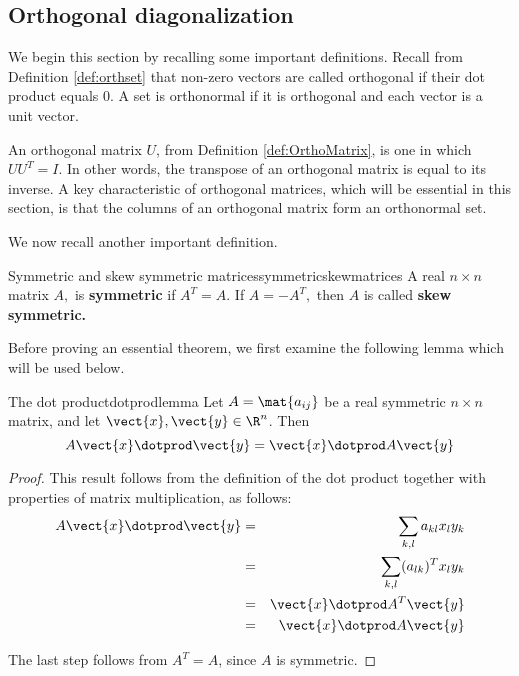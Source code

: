 \subsection{Orthogonal diagonalization}

We begin this section by recalling some important definitions. Recall from Definition \ref{def:orthset} that non-zero vectors are called orthogonal if their dot product equals $0$.  A set is orthonormal if it is orthogonal and each vector is a unit vector. 

An orthogonal matrix $U$, from Definition \ref{def:OrthoMatrix}, is one in which $UU^{T} = I$. In other words, the transpose of an orthogonal matrix is equal to its inverse. A key characteristic of orthogonal matrices, which will be essential in this section, is that the columns of an orthogonal matrix form an orthonormal set. 

We now recall another important definition. 

\begin{definition}{Symmetric and skew symmetric matrices}{symmetricskewmatrices}
A real $n\times n$ matrix $A,$ is \textbf{symmetric }if $A^{T}=A.$ If $%
A=-A^{T},$ then $A$ is called \textbf{skew symmetric. }
\end{definition}

Before proving an essential theorem, we first examine the following lemma which will be used below.

\begin{lemma}{The dot product}{dotprodlemma}
Let $A=\mat{a_{ij} }$ be a real symmetric $n \times n$ matrix, and let $\vect{x}, \vect{y} \in \R^n$. Then
\[
A\vect{x} \dotprod \vect{y} = \vect{x} \dotprod A \vect{y}
\]
\end{lemma}

\begin{proof}
This result follows from the definition of the dot product together with properties of matrix multiplication, as follows:
\begin{eqnarray*}
A\vect{x} \dotprod \vect{y} &=& \sum_{k,l}a_{kl}x_{l}y_{k} \\
&=&\sum_{k,l} (a_{lk})^Tx_{l}y_{k} \\
&=& \vect{x}\dotprod A^{T}\vect{y} \\
&=& \vect{x}\dotprod A \vect{y}
\end{eqnarray*}

The last step follows from $A^T = A$, since $A$ is symmetric. 
\end{proof}

